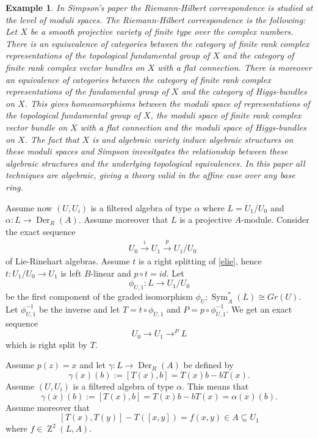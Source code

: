 \documentclass{amsart}
\theoremstyle{plain}
\newtheorem{example}[theorem]{Example}
\theoremstyle{definition}
\theoremstyle{remark}
\numberwithin{equation}{theorem}
\begin{document}
\begin{example} 

In Simpson's paper \cite{simpson} the Riemann-Hilbert correspondence is studied at the level of moduli spaces. The 
Riemann-Hilbert correspondence
is the following: Let $X$ be a smooth projective variety of finite type over the complex numbers. There is an equiuvalence 
of categories between the category of finite rank complex representations of the topological fundamental group of $X$ and the 
category of finite rank complex vector bundles on $X$ with a flat connection. There is moreover an equivalence of 
categories between the category of finite rank complex representations of the fundamental group of $X$ and the category of 
Higgs-bundles on $X$. This gives homeomorphisms between
the moduli space of representations of the topological fundamental group of $X$, 
the moduli space of finite rank complex vector bundle  on $X$ with a flat connection and 
the moduli space of Higgs-bundles on $X$. The fact that $X$ is and algebraic variety 
induce algebraic structures on these moduli spaces and Simpson invesitgates the relationship between these algebraic 
structures and the underlying topological equivalences. In this paper all techniques are algebraic, 
giving a theory valid in the affine case over any base ring. 
\end{example}

Assume now $(U,U_i)$ is a filtered algebra of type $\alpha$ where $L=U_1/U_0$ and $\alpha:L\rightarrow {\operatorname{Der} }_{R}({A})$.
Assume moreover that $L$ is a projective ${A}$-module.  Consider the exact sequence
\begin{align}
&\label{elie} U_0 \xrightarrow{i} U_1 \xrightarrow{p}  U_1/U_0  
\end{align}
of Lie-Rinehart algebras.
Assume $t$ is a right splitting of \ref{elie}, hence $t:U_1/U_0 \rightarrow U_1$ is left $B$-linear and $p\circ t=id$.
Let
\[ \phi_{U,1}:L\rightarrow U_1/U_0 \]
be the first component of the graded isomorphism $\phi_U:{\operatorname{Sym} }_{A}^*(L)\cong Gr(U)$.
Let $\phi_{U,1}^{-1}$ be the inverse and let $T=t\circ \phi_{U,1}$ and $P=p\circ \phi_{U,1}^{-1}$.
We get an exact sequence
\[ U_0 \rightarrow U_1 \rightarrow^P L  \]
which is right split by $T$.

Assume $p(z)=x$ and let $\gamma:L\rightarrow {\operatorname{Der} }_{R}({A})$ be defined by
\[\gamma(x)(b):=[T(x), b]=T(x)b-bT(x).\]
Assume $(U,U_i)$ is a filtered algebra of type $\alpha$. This means that
\[ \gamma(x)(b):=[T(x),b]=T(x)b-bT(x)=\alpha(x)(b).\]
Assume moreover that
\[ [T(x),T(y)]-T([x,y])=f(x,y) \in {A} \subseteq U_1\]
where $f\in {\operatorname{Z}}^2(L,{A})$.
\end{document}

